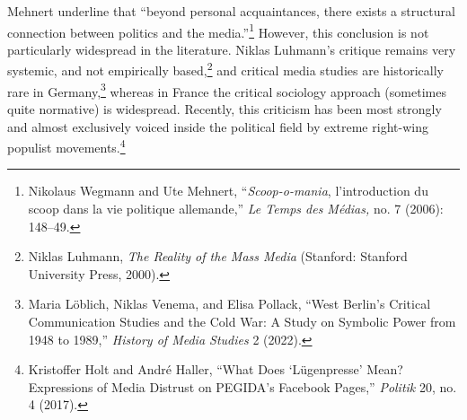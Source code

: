 \documentclass{tufte-handout}
\begin{document}
Mehnert underline that ``beyond personal acquaintances, there exists a
structural connection between politics and the media.''\footnote{Nikolaus
  Wegmann and Ute Mehnert, ``\emph{Scoop-o-mania}, l'introduction du
  scoop dans la vie politique allemande,'' \emph{Le Temps des Médias,}
  no. 7 (2006): 148--49.} However, this conclusion is not particularly
widespread in the literature. Niklas Luhmann's critique remains very
systemic, and not empirically based,\footnote{Niklas Luhmann, \emph{The
  Reality of the Mass Media} (Stanford: Stanford University Press,
  2000).} and critical media studies are historically rare in
Germany,\footnote{Maria Löblich, Niklas Venema, and Elisa Pollack,
  ``West Berlin's Critical Communication Studies and the Cold War: A
  Study on Symbolic Power from 1948 to 1989,'' \emph{History of Media
  Studies} 2 (2022).} whereas in France the critical sociology approach
(sometimes quite normative) is widespread. Recently, this criticism has
been most strongly and almost exclusively voiced inside the political
field by extreme right-wing populist movements.\footnote{Kristoffer Holt
  and André Haller, ``What Does `Lügenpresse' Mean? Expressions of Media
  Distrust on PEGIDA's Facebook Pages,'' \emph{Politik} 20, no. 4
  (2017).}
\end{document}
